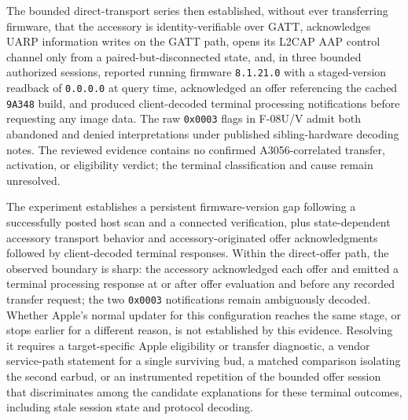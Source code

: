 \documentclass[11pt,letterpaper]{article}
\begin{document}
The bounded direct-transport series then established, without ever transferring firmware, that the accessory is identity-verifiable over GATT, acknowledges UARP information writes on the GATT path, opens its L2CAP AAP control channel only from a paired-but-disconnected state, and, in three bounded authorized sessions, reported running firmware \texttt{8.1.21.0} with a staged-version readback of \texttt{0.0.0.0} at query time, acknowledged an offer referencing the cached \texttt{9A348} build, and produced client-decoded terminal processing notifications before requesting any image data. The raw \texttt{0x0003} flags in F-08U/V admit both abandoned and denied interpretations under published sibling-hardware decoding notes. The reviewed evidence contains no confirmed A3056-correlated transfer, activation, or eligibility verdict; the terminal classification and cause remain unresolved.

The experiment establishes a persistent firmware-version gap following a successfully posted host scan and a connected verification, plus state-dependent accessory transport behavior and accessory-originated offer acknowledgments followed by client-decoded terminal responses. Within the direct-offer path, the observed boundary is sharp: the accessory acknowledged each offer and emitted a terminal processing response at or after offer evaluation and before any recorded transfer request; the two \texttt{0x0003} notifications remain ambiguously decoded. Whether Apple's normal updater for this configuration reaches the same stage, or stops earlier for a different reason, is not established by this evidence. Resolving it requires a target-specific Apple eligibility or transfer diagnostic, a vendor service-path statement for a single surviving bud, a matched comparison isolating the second earbud, or an instrumented repetition of the bounded offer session that discriminates among the candidate explanations for these terminal outcomes, including stale session state and protocol decoding.
\end{document}
